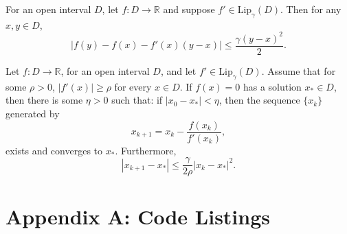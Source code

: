 \documentclass[11pt]{article}
\begin{document}
	\newpage
	\begin{tcolorbox}[colback=white,colframe=black!60!black,title=\textbf{Lemma 2.4.2}]
		For an open interval $D$, let $f: D \to \mathbb{R}$ and suppose $f' \in \text{Lip}_{\gamma}(D)$.
		Then for any $x, y \in D$,
		\[
		\big| f(y) - f(x) - f'(x)(y - x) \big| \le \frac{\gamma (y - x)^2}{2}. \tag{2.4.1}
		\]
	\end{tcolorbox}
	
	\begin{tcolorbox}[colback=white,colframe=black!60!black,title=\textbf{Theorem 2.4.3}]
		Let $f : D \to \mathbb{R}$, for an open interval $D$, and let $f' \in \text{Lip}_{\gamma}(D)$.
		Assume that for some $\rho > 0$, $|f'(x)| \ge \rho$ for every $x \in D$.
		If $f(x) = 0$ has a solution $x_* \in D$, then there is some $\eta > 0$ such that:
		if $|x_0 - x_*| < \eta$, then the sequence $\{x_k\}$ generated by
		\[
		x_{k+1} = x_k - \frac{f(x_k)}{f'(x_k)},
		\]
		exists and converges to $x_*$. Furthermore,
		\[
		|x_{k+1} - x_*| \le \frac{\gamma}{2\rho} |x_k - x_*|^2. \tag{2.4.3}
		\]
	\end{tcolorbox}
	
	\newpage
	\appendix
	\section*{Appendix A: Code Listings}
	
\end{document}
